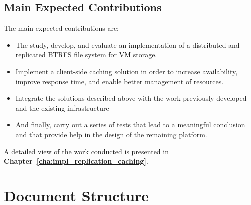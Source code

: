 



\subsection{Main Expected Contributions} %
\label{sub:main_expected_contributions}

The main expected contributions are: 

\begin{itemize}

  \item The study, develop, and evaluate an implementation of a distributed and replicated BTRFS file system for VM storage.
  \item Implement a client-side caching solution in order to increase availability, improve response time, and enable better management of resources.
  \item Integrate the solutions described above  with the work previously developed and the existing infrastructure
  \item And finally, carry out a series of tests that lead to a meaningful conclusion and that provide help in the design of the remaining platform.

\end{itemize}

A detailed view of the work conducted is presented in \textbf{Chapter~\ref{cha:impl_replication_caching}}.


\section{Document Structure} %
\label{sec:document_structure}

